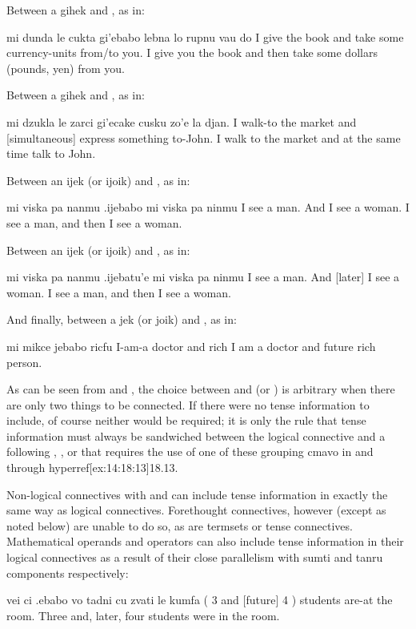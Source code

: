 Between a gihek and , as in:
\begin{example}
mi dunda le cukta\n
\T	gi'ebabo lebna lo rupnu vau do\n
I give the book\n
\T	and  take some currency-units from/to you.\n
I give you the book and then take some dollars\n
\T	(pounds, yen) from you.
\end{example}

Between a gihek and , as in:
\begin{example}
mi dzukla le zarci\n
\T	gi'ecake cusku zo'e la djan. \n
I walk-to the market\n
\T	and [simultaneous] express something to-John.\n
I walk to the market and at the same time talk to John.
\end{example}

Between an ijek (or ijoik) and ,
    as in:
\begin{example}
mi viska pa nanmu .ijebabo mi viska pa ninmu\n
I see a man. And  I see a woman.\n
I see a man, and then I see a woman.
\end{example}

Between an ijek (or ijoik) and
    , as in:
\begin{example}
mi viska pa nanmu\n
\T	.ijebatu'e mi viska pa ninmu \n
I see a man.\n
\T	And [later] I see a woman.\n
I see a man, and then I see a woman.
\end{example}

And finally, between a jek (or joik)
    and , as in:
\begin{example}
mi mikce jebabo ricfu\n
I-am-a doctor and  rich\n
I am a doctor and future rich person.
\end{example}

As can be seen from  and , the choice between  and
     (or ) is arbitrary when there are only two
    things to be connected. If there were no tense information to
    include, of course neither would be required; it is only the
    rule that tense information must always be sandwiched between
    the logical connective and a following , , or
     that requires the use of one of these grouping cmavo
    in  and  through hyperref[ex:14:18:13]{18.13}. 

Non-logical connectives with  and  can include
    tense information in exactly the same way as logical
    connectives. Forethought connectives, however (except as noted
    below) are unable to do so, as are termsets or tense
    connectives. Mathematical operands and operators can also
    include tense information in their logical connectives as a
    result of their close parallelism with sumti and tanru
    components respectively:
\begin{example}
vei ci .ebabo vo  tadni cu zvati le kumfa\n
( 3 and [future] 4 ) students are-at the room.\n
Three and, later, four students were in the room.
\end{example}

